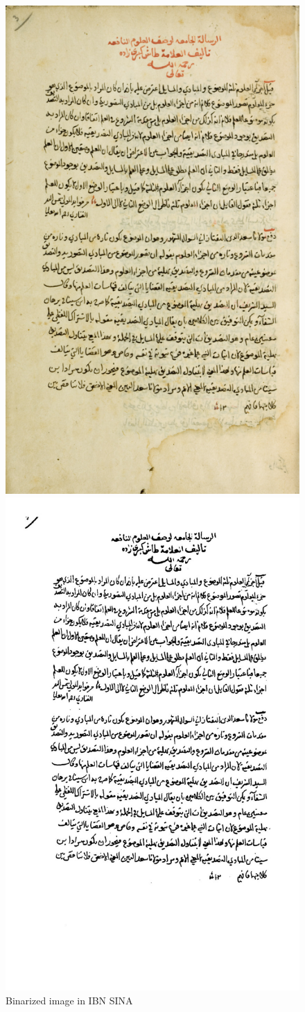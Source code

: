\begin{figure}[!htb]
    \centering
    \begin{minipage}{0.45\linewidth}
        \centering
        \includegraphics[width=0.6\linewidth, height=0.8\linewidth]{images/IBN SINA original image.png} %
        \caption{Original image in IBN SINA}
        \label{fig:adaptive-gaussian}
    \end{minipage}\hfill
    \begin{minipage}{0.45\linewidth}
        \centering
        \includegraphics[width=0.6\linewidth, height=0.8\linewidth]{images/IBN_SINA binarized sample.png} %
        \caption{Binarized image in IBN SINA}
        \label{fig:IBN_SINA binarized sample}
    \end{minipage}
\end{figure}


